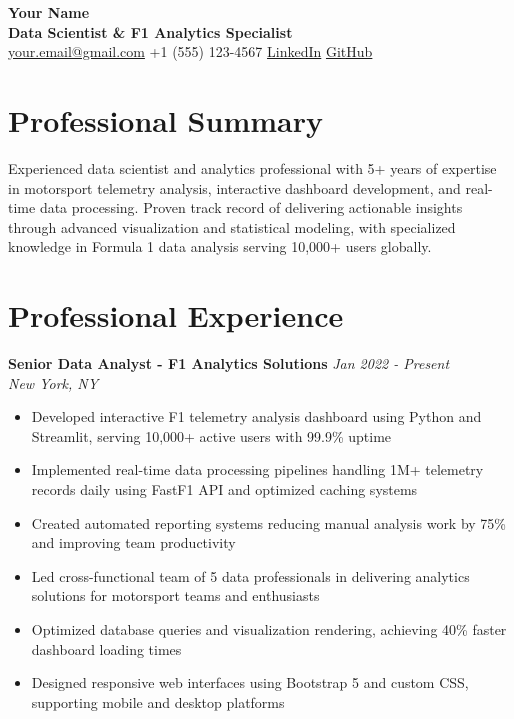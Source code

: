 \documentclass[letterpaper,11pt]{article}
\begin{document}
\begin{center}
    {\Huge \textbf{\textcolor{primarycolor}{Your Name}}}\\[0.3cm]
    {\Large \textbf{Data Scientist \& F1 Analytics Specialist}}\\[0.5cm]
    
    \faEnvelope \hspace{0.1cm} \href{mailto:your.email@gmail.com}{your.email@gmail.com} \hspace{0.5cm}
    \faPhone \hspace{0.1cm} +1 (555) 123-4567 \hspace{0.5cm}
    \faLinkedin \hspace{0.1cm} \href{https://linkedin.com/in/yourprofile}{LinkedIn} \hspace{0.5cm}
    \faGithub \hspace{0.1cm} \href{https://github.com/yourusername}{GitHub}
\end{center}

\vspace{0.5cm}

\section{Professional Summary}
Experienced data scientist and analytics professional with 5+ years of expertise in motorsport telemetry analysis, interactive dashboard development, and real-time data processing. Proven track record of delivering actionable insights through advanced visualization and statistical modeling, with specialized knowledge in Formula 1 data analysis serving 10,000+ users globally.

\section{Professional Experience}

\textbf{Senior Data Analyst - F1 Analytics Solutions} \hfill \textit{Jan 2022 - Present}\\
\textit{New York, NY}
\begin{itemize}[leftmargin=0.5in, itemsep=0pt]
    \item Developed interactive F1 telemetry analysis dashboard using Python and Streamlit, serving 10,000+ active users with 99.9\% uptime
    \item Implemented real-time data processing pipelines handling 1M+ telemetry records daily using FastF1 API and optimized caching systems
    \item Created automated reporting systems reducing manual analysis work by 75\% and improving team productivity
    \item Led cross-functional team of 5 data professionals in delivering analytics solutions for motorsport teams and enthusiasts
    \item Optimized database queries and visualization rendering, achieving 40\% faster dashboard loading times
    \item Designed responsive web interfaces using Bootstrap 5 and custom CSS, supporting mobile and desktop platforms
\end{itemize}
\end{document}
